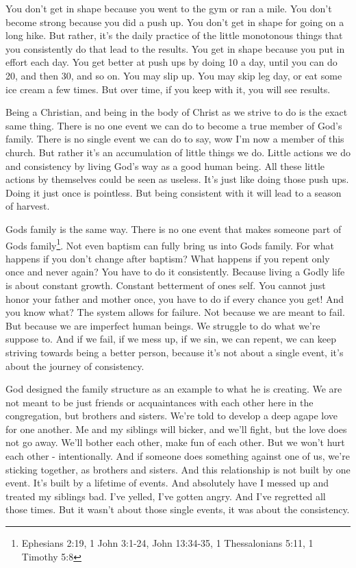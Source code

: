 \documentclass[11pt]{article}
\begin{document}
\begin{multicols}{2}
You don’t get in shape because you went to the gym or ran a mile. You don't become strong because you did a push up. You don't get in shape for going on a long hike. But rather, it’s the daily practice of the little monotonous things that you consistently do that lead to the results. You get in shape because you put in effort each day. You get better at push ups by doing 10 a day, until you can do 20, and then 30, and so on. You may slip up. You may skip leg day, or eat some ice cream a few times. But over time, if you keep with it, you will see results.

Being a Christian, and being in the body of Christ as we strive to do is the exact same thing. There is no one event we can do to become a true member of God's family. There is no single event we can do to say, wow I'm now a member of this church. But rather it's an accumulation of little things we do. Little actions we do and consistency by living God's way as a good human being. All these little actions by themselves could be seen as useless. It's just like doing those push ups. Doing it just once is pointless. But being consistent with it will lead to a season of harvest.

Gods family is the same way. There is no one event that makes someone part of Gods family\footnote{Ephesians 2:19, 1 John 3:1-24, John 13:34-35, 1 Thessalonians 5:11, 1 Timothy 5:8}. Not even baptism can fully bring us into Gods family. For what happens if you don't change after baptism? What happens if you repent only once and never again? You have to do it consistently. Because living a Godly life is about constant growth. Constant betterment of ones self. You cannot just honor your father and mother once, you have to do if every chance you get! And you know what? The system allows for failure. Not because we are meant to fail. But because we are imperfect human beings. We struggle to do what we're suppose to. And if we fail, if we mess up, if we sin, we can repent, we can keep striving towards being a better person, because it's not about a single event, it's about the journey of consistency.

God designed the family structure as an example to what he is creating. We are not meant to be just friends or acquaintances with each other here in the congregation, but brothers and sisters. We're told to develop a deep agape love for one another. Me and my siblings will bicker, and we'll fight, but the love does not go away. We'll bother each other, make fun of each other. But we won't hurt each other - intentionally. And if someone does something against one of us, we're sticking together, as brothers and sisters. And this relationship is not built by one event. It's built by a lifetime of events. And absolutely have I messed up and treated my siblings bad. I've yelled, I've gotten angry. And I've regretted all those times. But it wasn't about those single events, it was about the consistency. 


\end{multicols}
\end{document}
